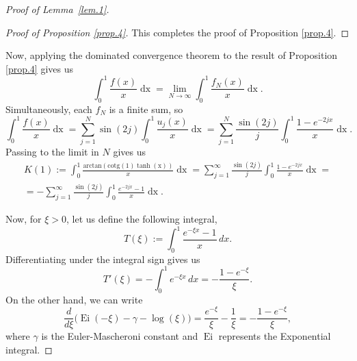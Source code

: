 \documentclass[preprint,12pt,nopreprintline]{elsarticle}
\begin{document}
\begin{proof}[Proof of Lemma~\ref{lem.1}]
\begin{proof}[Proof of Proposition \ref{prop.4}]
This completes the proof of Proposition \ref{prop.4}.
\end{proof}

Now, applying the dominated convergence theorem to the result of Proposition \ref{prop.4} gives us
\begin{equation}
\int_0^1\frac{f\left(x\right)}{x}\operatorname{dx}=\lim_{N\longrightarrow\infty}\int_0^1\frac{f_N\left(x\right)}{x}\operatorname{dx}.
\end{equation}
Simultaneously, each \(f_N\) is a finite sum, so
\begin{equation}
\int_0^1\frac{f\left(x\right)}{x}\operatorname{dx}=\sum_{j=1}^N\operatorname{sin}\left(2j\right)\int_0^1\frac{u_j\left(x\right)}{x}\operatorname{dx}=\sum_{j=1}^N\frac{\operatorname{sin}\left(2j\right)}{j}\int_0^1\frac{1-e^{-2jx}}{x}\operatorname{dx}.
\end{equation}
Passing to the limit in \(N\) gives us
\begin{equation}\label{eq.200}
\begin{aligned}
K\left(1\right):=\int_0^1\frac{\operatorname{arctan\left(\operatorname{cotg\left(1\right)\operatorname{tanh}\left(x\right)}\right)}}{x}\operatorname{dx}=\sum_{j=1}^{\infty}\frac{\operatorname{sin}\left(2j\right)}{j}\int_0^1\frac{1-e^{-2jx}}{x}\operatorname{dx}= \\
=-\sum_{j=1}^{\infty}\frac{\operatorname{sin}\left(2j\right)}{j}\int_0^1\frac{e^{-2jx}-1}{x}\operatorname{dx}.
\end{aligned}
\end{equation}

Now, for $\xi>0$, let us define the following integral,
\begin{equation}\label{eq:T-xi-def}
T(\xi):=\int_0^1 \frac{e^{-\xi x}-1}{x}\,dx.
\end{equation}
Differentiating under the integral sign gives us
\begin{equation}\label{eq:Tprime}
T'(\xi)
=
-\int_0^1 e^{-\xi x}\,dx
=
-\frac{1-e^{-\xi}}{\xi}.
\end{equation}
On the other hand, we can write
\[
\frac{d}{d\xi}\bigl(\operatorname{Ei}(-\xi)-\gamma-\log \left(\xi\right)\bigr)
=
\frac{e^{-\xi}}{\xi}-\frac{1}{\xi}
=
-\frac{1-e^{-\xi}}{\xi},
\]
where $\gamma$ is the Euler-Mascheroni constant and $\operatorname{Ei}$ represents the Exponential integral.


\end{proof}
\end{document}
